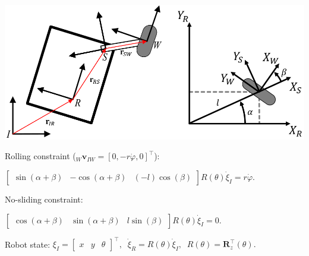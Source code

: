 \documentclass[landscape]{article}
\newcommand{\vmspace}{\vspace{-7pt}}
\begin{document}
\begin{multicols}{3}
\vspace{3pt}

\begin{minipage}{\columnwidth}
  \includegraphics[width=\columnwidth]{img/3_WheelEquations.png}
\end{minipage}

\vspace{5pt}

\begin{minipage}{\columnwidth}
  Rolling constraint (${}_W\mathbf v_{IW} = [0, -r\dot\varphi, 0]^\intercal$):
  \vmspace
  \begin{center}
    $\left[\begin{matrix}
      \sin(\alpha + \beta) & -\cos(\alpha + \beta) & (-l) \cos(\beta)
    \end{matrix}\right]
    R(\theta)\dot\xi_I
    =
    r \dot \varphi.$
  \end{center}
\end{minipage}

\begin{minipage}{\columnwidth}
  No-sliding constraint:
  \vmspace
  \begin{center}
    $\left[\begin{matrix}
      \cos(\alpha + \beta) & \sin(\alpha + \beta) & l \sin(\beta)
    \end{matrix}\right]
    R(\theta)\dot\xi_I
    =
    0.$
  \end{center}
\end{minipage}

\begin{minipage}{\columnwidth}
  Robot state:
    $\xi_I
    =
    \left[\begin{matrix}
      x & y & \theta
    \end{matrix}\right]^\intercal,
    \;\;
    \dot\xi_R = R(\theta)\dot\xi_I,
    \;\;
    R(\theta) = \mathbf R_z^\intercal(\theta).$
\end{minipage}


\end{multicols}
\end{document}
